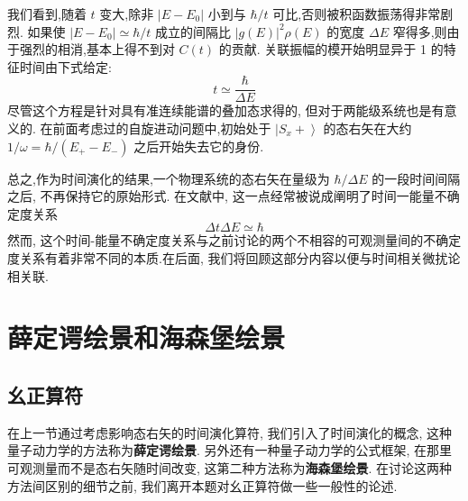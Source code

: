 \documentclass[lang=cn,newtx,10pt,scheme=chinese,thmcnt=section]{elegantbook}
\begin{document}
我们看到,随着 $t$ 变大,除非 $\left| {E - {E}_{0}}\right|$ 小到与 $\hbar /t$ 可比,否则被积函数振荡得非常剧烈. 如果使 $\left| {E - {E}_{0}}\right| \simeq \hbar /t$ 成立的间隔比 ${\left| g\left( E\right) \right| }^{2}\rho \left( E\right)$ 的宽度 ${\Delta E}$ 窄得多,则由于强烈的相消,基本上得不到对 $C\left( t\right)$ 的贡献. 关联振幅的模开始明显异于 1 的特征时间由下式给定:
\begin{equation}
	t \simeq \frac{\hbar }{\Delta E}
\end{equation}
尽管这个方程是针对具有准连续能谱的叠加态求得的, 但对于两能级系统也是有意义的. 在前面考虑过的自旋进动问题中,初始处于 $\left| {{S}_{x} + }\right\rangle$ 的态右矢在大约 $1/\omega = \hbar /\left( {{E}_{ + } - {E}_{ - }}\right)$ 之后开始失去它的身份.

总之,作为时间演化的结果,一个物理系统的态右矢在量级为 $\hbar /{\Delta E}$ 的一段时间间隔之后, 不再保持它的原始形式. 在文献中, 这一点经常被说成阐明了时间一能量不确定度关系
\begin{equation}
	{\Delta t\Delta E} \simeq \hbar
\end{equation}
然而, 这个时间-能量不确定度关系与之前讨论的两个不相容的可观测量间的不确定度关系有着非常不同的本质.在后面, 我们将回顾这部分内容以便与时间相关微扰论相关联.
\section{薛定谔绘景和海森堡绘景}
\subsection*{幺正算符}
在上一节通过考虑影响态右矢的时间演化算符, 我们引入了时间演化的概念, 这种量子动力学的方法称为\textbf{薛定谔绘景}. 另外还有一种量子动力学的公式框架, 在那里可观测量而不是态右矢随时间改变, 这第二种方法称为\textbf{海森堡绘景}. 在讨论这两种方法间区别的细节之前, 我们离开本题对幺正算符做一些一般性的论述.
\end{document}
